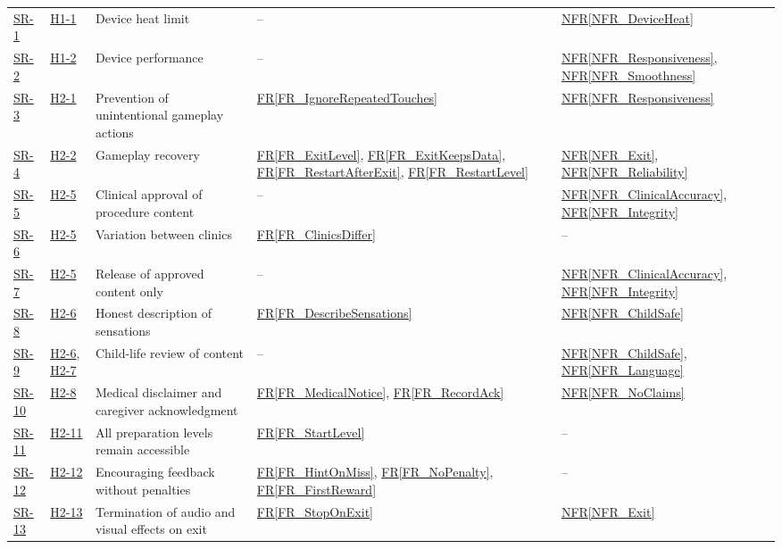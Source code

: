 \documentclass[10pt]{article}
\newcommand{\rref}[1]{\hyperref[#1]{FR\ref*{#1}}}
\newcommand{\nfrref}[1]{\hyperref[#1]{NFR\ref*{#1}}}
\newcommand{\haurl}{https://team-hindsight.github.io/ophthamology-game/HazardAnalysis/HazardAnalysis.pdf}
\newcommand{\hasrref}[2]{\href{\haurl\#nameddest=sr:#1}{SR-#2}}
\newcommand{\hahazref}[2]{\href{\haurl\#nameddest=haz:#1}{H#2}}
\begin{document}
\begin{longtable}{p{} p{} >{\raggedright\arraybackslash}p{} >{\raggedright\arraybackslash}p{} >{\raggedright\arraybackslash}p{}}
\hasrref{DeviceResourceUse}{1} & \hahazref{DeviceOverheating}{1-1} & Device heat limit & -- & \nfrref{NFR_DeviceHeat} \\
\hasrref{DevicePerformance}{2} & \hahazref{PoorPerformance}{1-2} & Device performance & -- & \nfrref{NFR_Responsiveness}, \nfrref{NFR_Smoothness} \\
\hasrref{PreventAccidentalInput}{3} & \hahazref{AccidentalInputSkipping}{2-1} & Prevention of unintentional gameplay actions & \rref{FR_IgnoreRepeatedTouches} & \nfrref{NFR_Responsiveness} \\
\hasrref{GameplayRecovery}{4} & \hahazref{GameplayStuck}{2-2} & Gameplay recovery & \rref{FR_ExitLevel}, \rref{FR_ExitKeepsData}, \rref{FR_RestartAfterExit}, \rref{FR_RestartLevel} & \nfrref{NFR_Exit}, \nfrref{NFR_Reliability} \\
\hasrref{ClinicianApproval}{5} & \hahazref{InaccurateProcedure}{2-5} & Clinical approval of procedure content & -- & \nfrref{NFR_ClinicalAccuracy}, \nfrref{NFR_Integrity} \\
\hasrref{ClinicsDiffer}{6} & \hahazref{InaccurateProcedure}{2-5} & Variation between clinics & \rref{FR_ClinicsDiffer} & -- \\
\hasrref{ApprovedContent}{7} & \hahazref{InaccurateProcedure}{2-5} & Release of approved content only & -- & \nfrref{NFR_ClinicalAccuracy}, \nfrref{NFR_Integrity} \\
\hasrref{HonestSensations}{8} & \hahazref{SensationsHidden}{2-6} & Honest description of sensations & \rref{FR_DescribeSensations} & \nfrref{NFR_ChildSafe} \\
\hasrref{ChildLifeReview}{9} & \hahazref{SensationsHidden}{2-6}, \hahazref{Frightening}{2-7} & Child-life review of content & -- & \nfrref{NFR_ChildSafe}, \nfrref{NFR_Language} \\
\hasrref{MedicalDisclaimer}{10} & \hahazref{MisinterpretedMedicalPurpose}{2-8} & Medical disclaimer and caregiver acknowledgment & \rref{FR_MedicalNotice}, \rref{FR_RecordAck} & \nfrref{NFR_NoClaims} \\
\hasrref{AllLevelsAccessible}{11} & \hahazref{RestrictedLevelAccess}{2-11} & All preparation levels remain accessible & \rref{FR_StartLevel} & -- \\
\hasrref{NonPunitiveFeedback}{12} & \hahazref{PunitiveFeedback}{2-12} & Encouraging feedback without penalties & \rref{FR_HintOnMiss}, \rref{FR_NoPenalty}, \rref{FR_FirstReward} & -- \\
\hasrref{StopAudioVisualsOnExit}{13} & \hahazref{AudioVisualsContinueOnExit}{2-13} & Termination of audio and visual effects on exit & \rref{FR_StopOnExit} & \nfrref{NFR_Exit} \\

\end{longtable}
\end{document}
